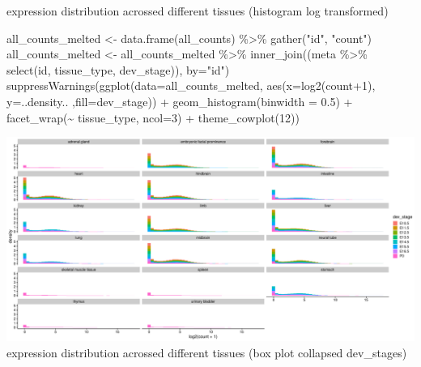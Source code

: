\documentclass[
]{article}
\newenvironment{Shaded}{\begin{snugshade}}{\end{snugshade}}
\newcommand{\AttributeTok}[1]{\textcolor[rgb]{0.77,0.63,0.00}{#1}}
\newcommand{\DecValTok}[1]{\textcolor[rgb]{0.00,0.00,0.81}{#1}}
\newcommand{\FloatTok}[1]{\textcolor[rgb]{0.00,0.00,0.81}{#1}}
\newcommand{\FunctionTok}[1]{\textcolor[rgb]{0.00,0.00,0.00}{#1}}
\newcommand{\NormalTok}[1]{#1}
\newcommand{\OtherTok}[1]{\textcolor[rgb]{0.56,0.35,0.01}{#1}}
\newcommand{\SpecialCharTok}[1]{\textcolor[rgb]{0.00,0.00,0.00}{#1}}
\newcommand{\StringTok}[1]{\textcolor[rgb]{0.31,0.60,0.02}{#1}}
\begin{document}
expression distribution acrossed different tissues (histogram log
transformed)

\begin{Shaded}
\begin{Highlighting}[]
\NormalTok{all\_counts\_melted }\OtherTok{\textless{}{-}} \FunctionTok{data.frame}\NormalTok{(all\_counts) }\SpecialCharTok{\%\textgreater{}\%} \FunctionTok{gather}\NormalTok{(}\StringTok{"id"}\NormalTok{, }\StringTok{"count"}\NormalTok{)}
\NormalTok{all\_counts\_melted }\OtherTok{\textless{}{-}}\NormalTok{ all\_counts\_melted }\SpecialCharTok{\%\textgreater{}\%} \FunctionTok{inner\_join}\NormalTok{((meta }\SpecialCharTok{\%\textgreater{}\%} \FunctionTok{select}\NormalTok{(id, tissue\_type, dev\_stage)), }\AttributeTok{by=}\StringTok{"id"}\NormalTok{)}
  \FunctionTok{suppressWarnings}\NormalTok{(}\FunctionTok{ggplot}\NormalTok{(}\AttributeTok{data=}\NormalTok{all\_counts\_melted, }\FunctionTok{aes}\NormalTok{(}\AttributeTok{x=}\FunctionTok{log2}\NormalTok{(count}\SpecialCharTok{+}\DecValTok{1}\NormalTok{), }\AttributeTok{y=}\NormalTok{..density.. ,}\AttributeTok{fill=}\NormalTok{dev\_stage)) }\SpecialCharTok{+} \FunctionTok{geom\_histogram}\NormalTok{(}\AttributeTok{binwidth =} \FloatTok{0.5}\NormalTok{) }\SpecialCharTok{+}  \FunctionTok{facet\_wrap}\NormalTok{(}\SpecialCharTok{\textasciitilde{}}\NormalTok{ tissue\_type, }\AttributeTok{ncol=}\DecValTok{3}\NormalTok{) }\SpecialCharTok{+} \FunctionTok{theme\_cowplot}\NormalTok{(}\DecValTok{12}\NormalTok{))}
\end{Highlighting}
\end{Shaded}

\includegraphics{Exploration_files/figure-latex/unnamed-chunk-11-1.pdf}
expression distribution acrossed different tissues (box plot collapsed
dev\_stages)
\end{document}
